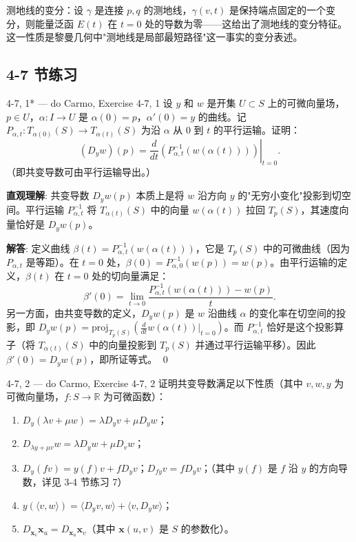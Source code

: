 \begin{Remark}
测地线的变分：设 $\gamma$ 是连接 $p,q$ 的测地线，$\gamma(v,t)$ 是保持端点固定的一个变分，则能量泛函 $E(t)$ 在 $t=0$ 处的导数为零——这给出了测地线的变分特征。这一性质是黎曼几何中"测地线是局部最短路径"这一事实的变分表述。
\end{Remark}

\subsection*{4-7 节练习}

\begin{exercise}{4-7, 1* — do Carmo, Exercise 4-7, 1}
设 $y$ 和 $w$ 是开集 $U \subset S$ 上的可微向量场，$p \in U$，$\alpha: I \to U$ 是 $\alpha(0)=p$，$\alpha'(0)=y$ 的曲线。记 $P_{\alpha,t}: T_{\alpha(0)}(S) \to T_{\alpha(t)}(S)$ 为沿 $\alpha$ 从 $0$ 到 $t$ 的平行运输。证明：
\[
(D_y w)(p) = \left.\frac{d}{dt}\left(P_{\alpha,t}^{-1}(w(\alpha(t)))\right)\right|_{t=0}.
\]
（即共变导数可由平行运输导出。）
\end{exercise}

\begin{solution}
\textbf{直观理解}: 共变导数 $D_yw(p)$ 本质上是将 $w$ 沿方向 $y$ 的"无穷小变化"投影到切空间。平行运输 $P_{\alpha,t}^{-1}$ 将 $T_{\alpha(t)}(S)$ 中的向量 $w(\alpha(t))$ 拉回 $T_p(S)$，其速度向量恰好是 $D_yw(p)$。

\textbf{解答}: 定义曲线 $\beta(t) = P_{\alpha,t}^{-1}(w(\alpha(t)))$，它是 $T_p(S)$ 中的可微曲线（因为 $P_{\alpha,t}$ 是等距）。在 $t=0$ 处，$\beta(0) = P_{\alpha,0}^{-1}(w(p)) = w(p)$。由平行运输的定义，$\beta(t)$ 在 $t=0$ 处的切向量满足：
\[
\beta'(0) = \lim_{t\to 0}\frac{P_{\alpha,t}^{-1}(w(\alpha(t))) - w(p)}{t}.
\]
另一方面，由共变导数的定义，$D_yw(p)$ 是 $w$ 沿曲线 $\alpha$ 的变化率在切空间的投影，即 $D_yw(p) = \mathrm{proj}_{T_p(S)}\left(\frac{d}{dt}w(\alpha(t))\Big|_{t=0}\right)$。而 $P_{\alpha,t}^{-1}$ 恰好是这个投影算子（将 $T_{\alpha(t)}(S)$ 中的向量投影到 $T_p(S)$ 并通过平行运输平移）。因此 $\beta'(0) = D_yw(p)$，即所证等式。
\qed
\end{solution}

\begin{exercise}{4-7, 2 — do Carmo, Exercise 4-7, 2}
证明共变导数满足以下性质（其中 $v,w,y$ 为可微向量场，$f: S \to \mathbb{R}$ 为可微函数）：
\begin{enumerate}
\item $D_y(\lambda v + \mu w) = \lambda D_y v + \mu D_y w$；
\item $D_{\lambda y + \mu v} w = \lambda D_y w + \mu D_v w$；
\item $D_y(fv) = y(f)v + f D_y v$；$D_{fy} v = f D_y v$；（其中 $y(f)$ 是 $f$ 沿 $y$ 的方向导数，详见 3-4 节练习 7）
\item $y(\langle v,w \rangle) = \langle D_y v, w \rangle + \langle v, D_y w \rangle$；
\item $D_{\mathbf{x}_v} \mathbf{x}_u = D_{\mathbf{x}_u} \mathbf{x}_v$（其中 $\mathbf{x}(u,v)$ 是 $S$ 的参数化）。
\end{enumerate}
\end{exercise}

